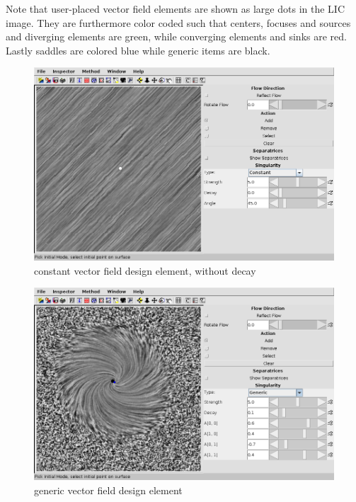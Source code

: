 \documentclass[a4paper,10pt,notitlepage]{scrreprt}
\begin{document}
Note that user-placed vector field elements are shown as large dots in the LIC
image. They are furthermore color coded such that centers, focuses and sources
and diverging elements are green, while converging elements and sinks are red.
Lastly saddles are colored blue while generic items are black.

\begin{figure}
  \centering
  \includegraphics[scale=0.5]{img-3-2/constant.png}
  \caption{constant vector field design element, without decay}
  \label{fig:constant}
\end{figure}

\begin{figure}
  \centering
  \includegraphics[scale=0.5]{img-3-2/generic.png}
  \caption{generic vector field design element}
  \label{fig:generic}
\end{figure}
\end{document}
